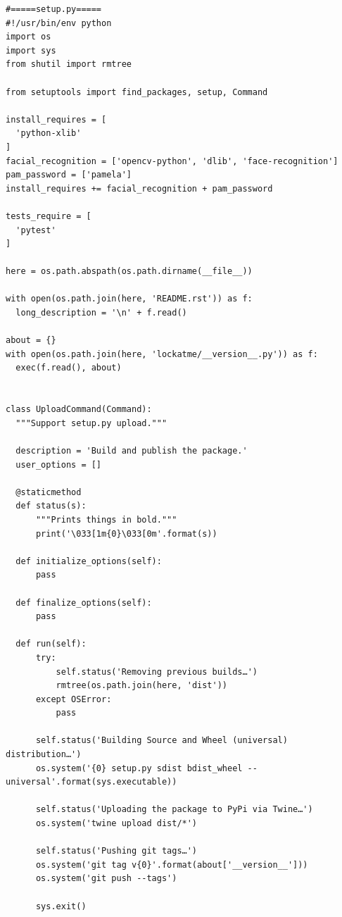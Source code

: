 \documentclass[french]{report}
\begin{document}
\begin{verbatim}
#=====setup.py=====
#!/usr/bin/env python
import os
import sys
from shutil import rmtree

from setuptools import find_packages, setup, Command

install_requires = [
  'python-xlib'
]
facial_recognition = ['opencv-python', 'dlib', 'face-recognition']
pam_password = ['pamela']
install_requires += facial_recognition + pam_password

tests_require = [
  'pytest'
]

here = os.path.abspath(os.path.dirname(__file__))

with open(os.path.join(here, 'README.rst')) as f:
  long_description = '\n' + f.read()

about = {}
with open(os.path.join(here, 'lockatme/__version__.py')) as f:
  exec(f.read(), about)


class UploadCommand(Command):
  """Support setup.py upload."""

  description = 'Build and publish the package.'
  user_options = []

  @staticmethod
  def status(s):
      """Prints things in bold."""
      print('\033[1m{0}\033[0m'.format(s))

  def initialize_options(self):
      pass

  def finalize_options(self):
      pass

  def run(self):
      try:
          self.status('Removing previous builds…')
          rmtree(os.path.join(here, 'dist'))
      except OSError:
          pass

      self.status('Building Source and Wheel (universal) distribution…')
      os.system('{0} setup.py sdist bdist_wheel --universal'.format(sys.executable))

      self.status('Uploading the package to PyPi via Twine…')
      os.system('twine upload dist/*')

      self.status('Pushing git tags…')
      os.system('git tag v{0}'.format(about['__version__']))
      os.system('git push --tags')

      sys.exit()



\end{verbatim}
\end{document}
